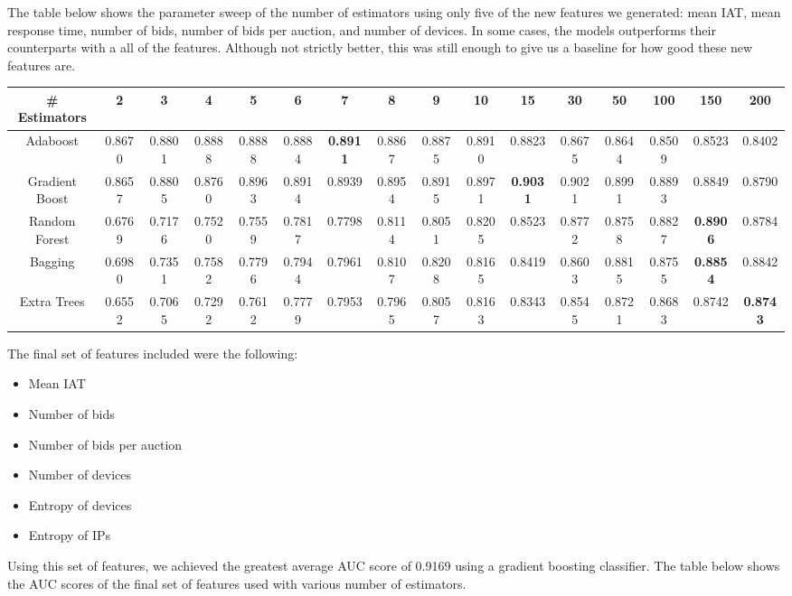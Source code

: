 \documentclass{article} %
\begin{document}
The table below shows the parameter sweep of the number of estimators using only five
of the new features we generated: mean IAT, mean response time, number of bids,
number of bids per auction, and number of devices. In some cases, the models
outperforms their counterparts with a all of the features. Although not strictly
better, this was still enough to give us a baseline for how good these new features are.

\begin{adjustbox}{width=\textwidth,totalheight=\textheight,keepaspectratio}
\begin{tabular}{c | c c c c c c c c c c c c c c c}
\# Estimators & 2 & 3 & 4 & 5 & 6 & 7 & 8 & 9 & 10 & 15 & 30 & 50 & 100 & 150 & 200\\
\hline
Adaboost & 0.8670 & 0.8801 & 0.8888 & 0.8888 & 0.8884 & \textbf{0.8911} & 0.8867 & 0.8875 & 0.8910 & 0.8823 & 0.8675 & 0.8644 & 0.8509 & 0.8523 & 0.8402\\
Gradient Boost & 0.8657 & 0.8805 & 0.8760 & 0.8963 & 0.8914 & 0.8939 & 0.8954 & 0.8915 & 0.8971 & \textbf{0.9031} & 0.9021 & 0.8991 & 0.8893 & 0.8849 & 0.8790\\
Random Forest & 0.6769 & 0.7176 & 0.7520 & 0.7559 & 0.7817 & 0.7798 & 0.8114 & 0.8051 & 0.8205 & 0.8523 & 0.8772 & 0.8758 & 0.8827 & \textbf{0.8906} & 0.8784\\
Bagging & 0.6980 & 0.7351 & 0.7582 & 0.7796 & 0.7944 & 0.7961 & 0.8107 & 0.8208 & 0.8165 & 0.8419 & 0.8603 & 0.8815 & 0.8755 & \textbf{0.8854} & 0.8842\\
Extra Trees & 0.6552 & 0.7065 & 0.7292 & 0.7612 & 0.7779 & 0.7953 & 0.7965 & 0.8057 & 0.8163 & 0.8343 & 0.8545 & 0.8721 & 0.8683 & 0.8742 & \textbf{0.8743}
\end{tabular}
\end{adjustbox}


The final set of features included were the following:

\begin{itemize}
\item Mean IAT
\item Number of bids
\item Number of bids per auction
\item Number of devices
\item Entropy of devices
\item Entropy of IPs
\end{itemize}

Using this set of features, we achieved the greatest average AUC score of
0.9169 using a gradient boosting classifier. The table below shows the AUC scores of the final set of features used with various number of estimators.
\end{document}
